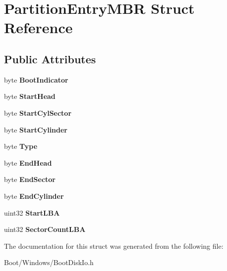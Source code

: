 \hypertarget{struct_partition_entry_m_b_r}{}\section{Partition\+Entry\+M\+BR Struct Reference}
\label{struct_partition_entry_m_b_r}
\subsection*{Public Attributes}
\begin{DoxyCompactItemize}
\item 
\mbox{\label{struct_partition_entry_m_b_r_a867486a8c9e1bebc3b53a40eac751d7f}} 
byte {\bfseries Boot\+Indicator}
\item 
\mbox{\label{struct_partition_entry_m_b_r_a6e546ac4427343f24e9e8718070ec550}} 
byte {\bfseries Start\+Head}
\item 
\mbox{\label{struct_partition_entry_m_b_r_aeed19e7e2757a15b440d6daa938696e8}} 
byte {\bfseries Start\+Cyl\+Sector}
\item 
\mbox{\label{struct_partition_entry_m_b_r_a7d883fc4013c40e3b2e2bb7c49e8867a}} 
byte {\bfseries Start\+Cylinder}
\item 
\mbox{\label{struct_partition_entry_m_b_r_ad2b6dcae7b576ffef3fdd577674ccbd5}} 
byte {\bfseries Type}
\item 
\mbox{\label{struct_partition_entry_m_b_r_a9b1ea43b73e94f332ef589bb187c2a63}} 
byte {\bfseries End\+Head}
\item 
\mbox{\label{struct_partition_entry_m_b_r_aea6b0888aae34f69ffbc32cc4801b41b}} 
byte {\bfseries End\+Sector}
\item 
\mbox{\label{struct_partition_entry_m_b_r_a40f88e95723707d2ea4017f3cf339a22}} 
byte {\bfseries End\+Cylinder}
\item 
\mbox{\label{struct_partition_entry_m_b_r_a397ba357b0421eec63b22dcb8d89064b}} 
uint32 {\bfseries Start\+L\+BA}
\item 
\mbox{\label{struct_partition_entry_m_b_r_a80f886313abed160169ffeef2c1b4d1b}} 
uint32 {\bfseries Sector\+Count\+L\+BA}
\end{DoxyCompactItemize}


The documentation for this struct was generated from the following file\+:\begin{DoxyCompactItemize}
\item 
Boot/\+Windows/Boot\+Disk\+Io.\+h\end{DoxyCompactItemize}
